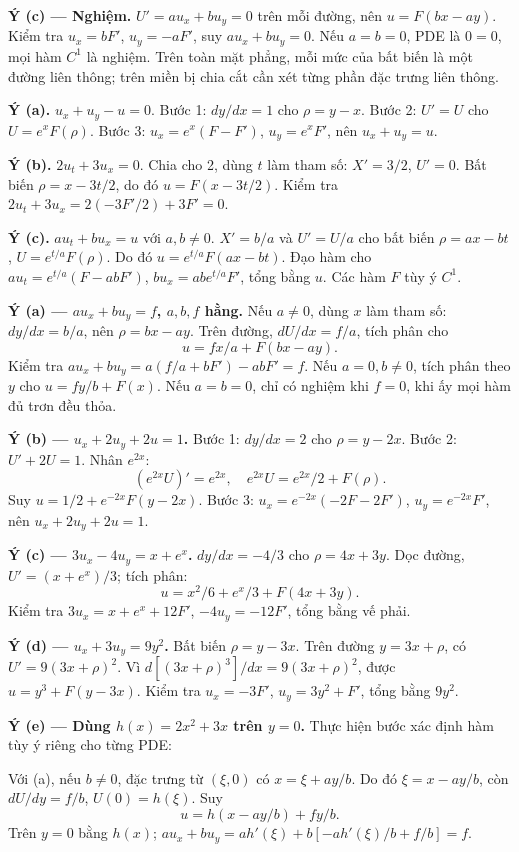 \textbf{Ý (c) — Nghiệm.} $U'=au_x+bu_y=0$ trên mỗi đường, nên $u=F(bx-ay)$. Kiểm tra $u_x=bF'$, $u_y=-aF'$, suy $au_x+bu_y=0$. Nếu $a=b=0$, PDE là $0=0$, mọi hàm $C^1$ là nghiệm. Trên toàn mặt phẳng, mỗi mức của bất biến là một đường liên thông; trên miền bị chia cắt cần xét từng phần đặc trưng liên thông.

\textbf{Ý (a).} $u_x+u_y-u=0$. Bước 1: $dy/dx=1$ cho $\rho=y-x$. Bước 2: $U'=U$ cho $U=e^xF(\rho)$. Bước 3: $u_x=e^x(F-F')$, $u_y=e^xF'$, nên $u_x+u_y=u$.

\textbf{Ý (b).} $2u_t+3u_x=0$. Chia cho 2, dùng $t$ làm tham số: $X'=3/2$, $U'=0$. Bất biến $\rho=x-3t/2$, do đó $u=F(x-3t/2)$. Kiểm tra $2u_t+3u_x=2(-3F'/2)+3F'=0$.

\textbf{Ý (c).} $au_t+bu_x=u$ với $a,b\ne0$. $X'=b/a$ và $U'=U/a$ cho bất biến $\rho=ax-bt$, $U=e^{t/a}F(\rho)$. Do đó $u=e^{t/a}F(ax-bt)$. Đạo hàm cho $au_t=e^{t/a}(F-abF')$, $bu_x=ab e^{t/a}F'$, tổng bằng $u$. Các hàm $F$ tùy ý $C^1$.

\textbf{Ý (a) — $au_x+bu_y=f$, $a,b,f$ hằng.} Nếu $a\ne0$, dùng $x$ làm tham số: $dy/dx=b/a$, nên $\rho=bx-ay$. Trên đường, $dU/dx=f/a$, tích phân cho
\[u=fx/a+F(bx-ay).\]
Kiểm tra $au_x+bu_y=a(f/a+bF')-abF'=f$. Nếu $a=0,b\ne0$, tích phân theo $y$ cho $u=fy/b+F(x)$. Nếu $a=b=0$, chỉ có nghiệm khi $f=0$, khi ấy mọi hàm đủ trơn đều thỏa.

\textbf{Ý (b) — $u_x+2u_y+2u=1$.} Bước 1: $dy/dx=2$ cho $\rho=y-2x$. Bước 2: $U'+2U=1$. Nhân $e^{2x}$:
\[(e^{2x}U)'=e^{2x},\quad e^{2x}U=e^{2x}/2+F(\rho).\]
Suy $u=1/2+e^{-2x}F(y-2x)$. Bước 3: $u_x=e^{-2x}(-2F-2F')$, $u_y=e^{-2x}F'$, nên $u_x+2u_y+2u=1$.

\textbf{Ý (c) — $3u_x-4u_y=x+e^x$.} $dy/dx=-4/3$ cho $\rho=4x+3y$. Dọc đường, $U'=(x+e^x)/3$; tích phân:
\[u=x^2/6+e^x/3+F(4x+3y).\]
Kiểm tra $3u_x=x+e^x+12F'$, $-4u_y=-12F'$, tổng bằng vế phải.

\textbf{Ý (d) — $u_x+3u_y=9y^2$.} Bất biến $\rho=y-3x$. Trên đường $y=3x+\rho$, có $U'=9(3x+\rho)^2$. Vì $d[(3x+\rho)^3]/dx=9(3x+\rho)^2$, được $u=y^3+F(y-3x)$. Kiểm tra $u_x=-3F'$, $u_y=3y^2+F'$, tổng bằng $9y^2$.

\textbf{Ý (e) — Dùng $h(x)=2x^2+3x$ trên $y=0$.} Thực hiện bước xác định hàm tùy ý riêng cho từng PDE:

Với (a), nếu $b\ne0$, đặc trưng từ $(\xi,0)$ có $x=\xi+ay/b$. Do đó $\xi=x-ay/b$, còn $dU/dy=f/b$, $U(0)=h(\xi)$. Suy
\[u=h(x-ay/b)+fy/b.\]
Trên $y=0$ bằng $h(x)$; $au_x+bu_y=ah'(\xi)+b[-ah'(\xi)/b+f/b]=f$.

